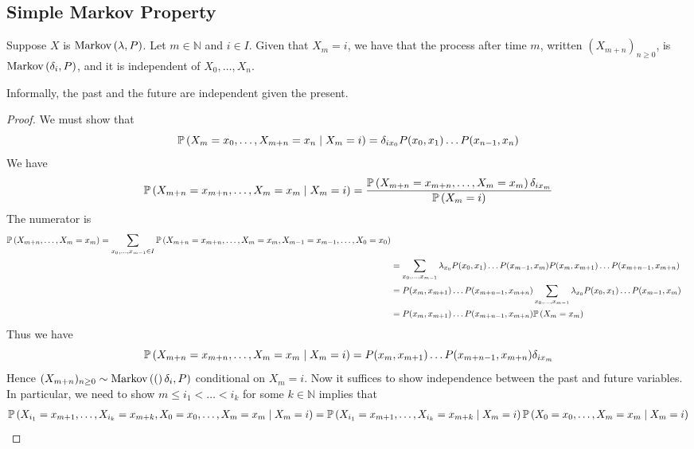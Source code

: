 \subsection{Simple Markov Property}
\begin{theorem}
	Suppose \( X \) is \( \operatorname{Markov}\left({\lambda, P}\right) \).
	Let \( m \in \mathbb N \) and \( i \in I \).
	Given that \( X_m = i \), we have that the process after time \( m \), written \( (X_{m+n})_{n \geq 0} \), is \( \operatorname{Markov}\left({\delta_i, P}\right) \), and it is independent of \( X_0, \dots, X_n \).
\end{theorem}
\noindent Informally, the past and the future are independent given the present.
\begin{proof}
	We must show that
	\[
		\mathbb{P}\left({X_m = x_0, \dots, X_{m+n} = x_n \mid X_m = i}\right) = \delta_{i x_0} P(x_0, x_1) \dots P(x_{n-1}, x_n)
	\]
	We have
	\[
		\mathbb{P}\left({X_{m+n} = x_{m+n}, \dots, X_m = x_m \mid X_m = i}\right)
		= \frac{\mathbb{P}\left({X_{m+n} = x_{m+n}, \dots, X_m = x_m}\right) \delta_{i x_m}}{\mathbb{P}\left({X_m = i}\right)}
	\]
	The numerator is
	\begin{align*}
		\mathbb{P}\left({X_{m+n}, \dots, X_m = x_m}\right) = \sum_{x_0, \dots, x_{m-1} \in I} \mathbb{P}\left({X_{m+n} = x_{m+n}, \dots, X_m = x_m, X_{m-1} = x_{m-1}, \dots, X_0 = x_0}\right) \\
		 & = \sum_{x_0, \dots, x_{m-1}} \lambda_{x_0} P(x_0, x_1) \dots P(x_{m-1}, x_m) P(x_m, x_{m+1}) \dots P(x_{m+n-1}, x_{m+n})                         \\
		 & = P(x_m, x_{m+1}) \dots P(x_{m+n-1}, x_{m+n}) \sum_{x_0, \dots, x_{m-1}} \lambda_{x_0} P(x_0, x_1) \dots P(x_{m-1}, x_m)                         \\
		 & = P(x_m, x_{m+1}) \dots P(x_{m+n-1}, x_{m+n}) \mathbb{P}\left({X_m = x_m}\right)                                                                                   \\
	\end{align*}
	Thus we have
	\[
		\mathbb{P}\left({X_{m+n} = x_{m+n}, \dots, X_m = x_m \mid X_m = i}\right)
		= P(x_m, x_{m+1}) \dots P(x_{m+n-1}, x_{m+n}) \delta_{i x_m}
	\]
	Hence \( (X_{m+n})_{n \geq 0} \sim \operatorname{Markov}\left({(}\right)\delta_i, P) \) conditional on \( X_m = i \).
	Now it suffices to show independence between the past and future variables.
	In particular, we need to show \( m \leq i_1 < \dots < i_k \) for some \( k \in \mathbb N \) implies that
	\begin{align*}
		\prob{X_{i_1} = x_{m+1}, \dots, X_{i_k} = x_{m+k}, X_0 = x_0, \dots, X_m = x_m \mid X_m = i} & = \prob{X_{i_1} = x_{m+1}, \dots, X_{i_k} = x_{m+k} \mid X_m = i} \prob{X_0 = x_0, \dots, X_m = x_m \mid X_m = i}                          \\

\end{align*}
\end{proof}
